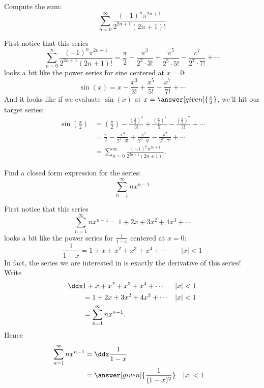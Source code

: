 \documentclass{ximera}
\begin{document}
\begin{example}
  Compute the sum:
  \[
  \sum_{n=0}^\infty \frac{(-1)^n \pi^{2n+1}}{2^{2n+1}(2n+1)!}
  \]
  \begin{explanation}
    First notice that this series
    \[
    \sum_{n=0}^\infty \frac{(-1)^n \pi^{2n+1}}{2^{2n+1}(2n+1)!} = \frac{\pi}{2} - \frac{\pi^3}{2^3\cdot 3!}+ \frac{\pi^5}{2^5\cdot 5!} - \frac{\pi^7}{2^7\cdot 7!} + \cdots
    \]
    looks a bit like the power series for sine centered at $x=0$:
    \[
    \sin(x) = x-\frac{x^3}{3!} + \frac{x^5}{5!} - \frac{x^7}{7!}+ \cdots
    \]
    And it looks like if we evaluate $\sin(x)$ at $x =
    \answer[given]{\frac{\pi}{2}}$, we'll hit our target series:
    \begin{align*}
      \sin\left(\frac{\pi}{2}\right) &=\left(\frac{\pi}{2}\right)-\frac{\left(\frac{\pi}{2}\right)^3}{3!} + \frac{\left(\frac{\pi}{2}\right)^5}{5!} - \frac{\left(\frac{\pi}{2}\right)^7}{7!}+ \cdots\\
      &= \frac{\pi}{2} - \frac{\pi^3}{2^3\cdot 3!}+ \frac{\pi^5}{2^5\cdot 5!} - \frac{\pi^7}{2^7\cdot 7!} + \cdots\\
      &=\sum_{n=0}^\infty \frac{(-1)^n \pi^{2n+1}}{2^{2n+1}(2n+1)!}.
    \end{align*}
  \end{explanation}
\end{example}



\begin{example}
  Find a closed form expression for the series:
  \[
  \sum_{n=1}^\infty nx^{n-1}
  \]
  \begin{explanation}
    First notice that this series
    \[
    \sum_{n=1}^\infty nx^{n-1} = 1 + 2x + 3x^2 + 4x^3 + \cdots
    \]
    looks a bit like the power series for $\frac{1}{1-x}$  centered at $x=0$:
    \[
    \frac{1}{1-x} = 1+ x+x^2 + x^3+x^4+\cdots\qquad |x|<1
    \]
    In fact, the series we are interested in is exactly the derivative of this series! Write
    \begin{align*}
    \ddx &1+ x+x^2 + x^3+x^4+\cdots && |x|<1\\
    &=1 + 2x + 3x^2 + 4x^3 + \cdots && |x|<1\\
    &=\sum_{n=1}^\infty nx^{n-1}.
    \end{align*}
    Hence
    \begin{align*}
    \sum_{n=1}^\infty nx^{n-1} &= \ddx \frac{1}{1-x}\\
    &=\answer[given]{\frac{1}{(1-x)^2}}&& |x|<1
    \end{align*}
  \end{explanation}
\end{example}
\end{document}
